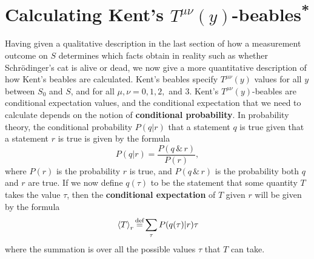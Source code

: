 \section{Calculating Kent's $T^{\mu\nu}(y)$-beables\textsuperscript{*} \label{kentcalculation}}
Having given a qualitative description in the last section of how a measurement outcome on $S$ determines which facts obtain in reality such as whether Schr\"{o}dinger's cat is alive or dead, we now give a more quantitative description of how Kent's beables are calculated. Kent's beables specify $T^{\mu\nu}(y)$ values for all $y$ between $S_0$ and $S$, and for all $\mu,\nu = 0, 1, 2,$ and $3$. Kent's $T^{\mu\nu}(y)$-beables are conditional expectation values, and the conditional expectation that we need to calculate depends on the notion of \textbf{conditional probability}. In probability theory, the conditional probability $P(q|r)$ that a statement $q$ is true given that a statement $r$ is true is given by the formula
\begin{equation} \label{conditionalprobability}
  P(q|r)=\frac{P(q\, \&\,  r)}{P(r)},
\end{equation}
where $P(r)$ is the probability $r$ is true, and $P(q\, \&\,  r)$ is the probability both $q$ and $r$ are true.
If we now define $q(\tau)$ to be the statement that some quantity $T$  takes the value $\tau$, then the  \textbf{conditional expectation} of  $T$ given $r$ will be given by the formula
\begin{equation}\label{conditionalexpectation}
\ev*{T}_r\myeq\sum_\tau P(q(\tau)|r)\tau
\end{equation}
where the summation is over all the possible values $\tau$ that $T$ can take.

